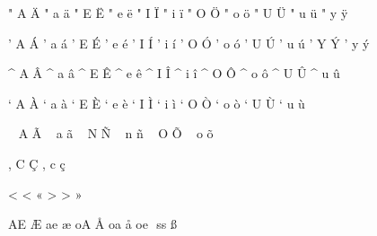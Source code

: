 

\startencoding[pdfdoc]

  " A ^^c4 
  " a ^^e4
  " E ^^cb
  " e ^^eb
  " I ^^cf
  " i ^^ef
  " O ^^d6
  " o ^^f6
  " U ^^dc
  " u ^^fc
  " y ^^ff
             
  ' A ^^c1
  ' a ^^e1
  ' E ^^c9
  ' e ^^e9
  ' I ^^cd
  ' i ^^ed
  ' O ^^d3
  ' o ^^f3
  ' U ^^da
  ' u ^^fa
  ' Y ^^dd
  ' y ^^fd
             
  ^ A ^^c2
  ^ a ^^e2
  ^ E ^^ca
  ^ e ^^ea
  ^ I ^^ce
  ^ i ^^ee
  ^ O ^^d4
  ^ o ^^f4
  ^ U ^^db
  ^ u ^^fb
             
  ` A ^^c0
  ` a ^^e0
  ` E ^^c8
  ` e ^^e8
  ` I ^^cc
  ` i ^^ec
  ` O ^^d2
  ` o ^^f2
  ` U ^^d9
  ` u ^^f9
             
  ~ A ^^c3
  ~ a ^^e3
  ~ N ^^d1
  ~ n ^^f1
  ~ O ^^d5
  ~ o ^^f5

  , C ^^c7
  , c ^^e7
             
  < < ^^ab
  > > ^^bb
             
 AE ^^c6
 ae ^^e6
 oA ^^c5
 oa ^^e5
 oe ^^9c
 ss ^^df
 
\stopencoding

\endinput
